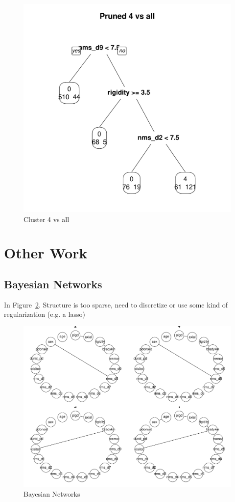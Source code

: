\documentclass[letterpaper,12pt]{article}
\begin{document}
\begin{figure}[h]
  \centering
  \includegraphics[width=\linewidth]{dtree-4va-pruned.pdf}
  \caption{Cluster 4 vs all}
  \label{fig:4va}
\end{figure}
\section{Other Work}

\subsection{Bayesian Networks}

In Figure~\ref{fig:bnets}. Structure is too sparse, need to discretize or use
some kind of regularization (e.g. a lasso)

\begin{figure}[h]
  \centering
  \includegraphics[width=0.8\linewidth]{bnets.pdf}
  \caption{Bayesian Networks}
  \label{fig:bnets}
\end{figure}
\end{document}
